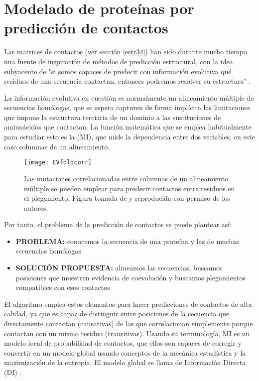 \section{Modelado de prote\'{i}nas por predicci\'{o}n de contactos} \label{contactosPred}

Las matrices de contactos (ver secci\'{o}n \ref{estr34})  han sido durante mucho tiempo una fuente de inspiraci\'{o}n de m\'{e}todos 
de predicci\'{o}n estructural, con la idea subyacente de "si somos capaces de predecir con informaci\'{o}n evolutiva qu\'{e} residuos de 
una secuencia contactan, entonces podremos resolver su estructura" \citep{Gobel1994,deJuan2013}.

La informaci\'{o}n evolutiva en cuesti\'{o}n es normalmente un alineamiento m\'{u}ltiple de secuencias hom\'{o}logas, que se espera
capturen de forma impl\'{i}cita las limitaciones que impone la estructura terciaria de un dominio a las sustituciones de amino\'{a}cidos
que contactan. La funci\'{o}n matem\'{a}tica que se emplea habitualmente para estudiar esto es la 
 (MI), 
que mide la dependencia entre dos variables, en este caso columnas de un alineamiento.

\begin{figure}
\begin{center} 
\texttt{[image: EVfoldcorr]}
\caption%
{
Las mutaciones correlacionadas entre columnas de un alineamiento m\'{u}ltiple se pueden emplear para predecir contactos entre residuos en el plegamiento.
Figura tomada de \cite{Marks2011} y reproducida con permiso de los autores.
}
\label{fig:EVfold1}
\end{center}
\end{figure}

Por tanto, el problema de la predicci\'{o}n de contactos se puede plantear as\'{i}:
\begin{itemize}
\item \textbf{PROBLEMA:} conocemos la secuencia de una prote\'{i}na y las de muchas secuencias hom\'{o}logas
\item \textbf{SOLUCI\'{O}N PROPUESTA:} alineamos las secuencias, buscamos posiciones que muestren evidencia de coevoluci\'{o}n 
y buscamos plegamientos compatibles con esos contactos
\end{itemize}

El algoritmo  %
emplea estos elementos
para hacer predicciones de contactos de alta calidad, ya que es capaz de distinguir entre posiciones de la secuencia
que directamente contactan (causativas) de las que correlacionan simplemente porque contactan con un mismo residuo (transitivas). 
Usando su terminolog\'{i}a,
MI es un modelo local de probabilidad de contactos, que ellos son capaces de corregir y convertir en un modelo global usando conceptos 
de la mec\'{a}nica estad\'{i}stica y la maximizaci\'{o}n de la entrop\'{i}a. El modelo global se llama de Informaci\'{o}n Directa (DI)
\citep{Marks2011}.

